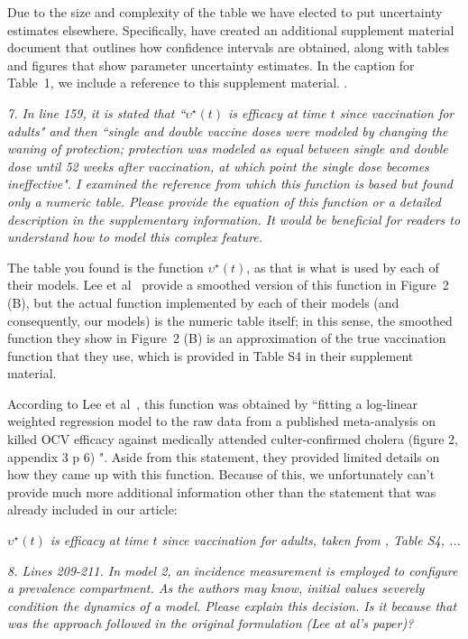 \documentclass[11pt]{article}
\newcommand\report[1]{{\color{mygreen} \vspace{1mm}\hspace{0.25in}\parbox{6in}{\em #1}}}
\newcommand\article[1]{{\color{blue} \vspace{1mm}\hspace{0.25in}\parbox{6in}{\em #1}}}
\begin{document}
Due to the size and complexity of the table we have elected to put uncertainty estimates elsewhere. Specifically, have created an additional supplement material document that outlines how confidence intervals are obtained, along with tables and figures that show parameter uncertainty estimates. In the caption for Table~1, we include a reference to this supplement material. . 

\report{
  7. In line 159, it is stated that ``$\upsilon^\star(t)$ is efficacy at time $t$ since vaccination for adults" and then ``single and double vaccine doses were modeled by changing the waning of protection; protection was modeled as equal between single and double dose until 52 weeks after vaccination, at which point the single dose becomes ineffective". I examined the reference from which this function is based but found only a numeric table. Please provide the equation of this function or a detailed description in the supplementary information. It would be beneficial for readers to understand how to model this complex feature.
}

The table you found is the function $\upsilon^\star(t)$, as that is what is used by each of their models. Lee et al~\cite{lee20} provide a smoothed version of this function in Figure~2 (B), but the actual function implemented by each of their models (and consequently, our models) is the numeric table itself; in this sense, the smoothed function they show in Figure~2 (B) is an approximation of the true vaccination function that they use, which is provided in Table S4 in their supplement material. 

According to Lee et al~\cite{lee20}, this function was obtained by ``fitting a log-linear weighted regression model to the raw data from a published meta-analysis on killed OCV efficacy against medically attended culter-confirmed cholera (figure 2, appendix 3 p 6) \cite{bi17}". Aside from this statement, they provided limited details on how they came up with this function. Because of this, we unfortunately can't provide much more additional information other than the statement that was already included in our article: 

\article{$\upsilon^\star(t)$ is efficacy at time $t$ since vaccination for adults, taken from \cite{lee20}, Table S4, ...}

\report{
  8. Lines 209-211. In model 2, an incidence measurement is employed to configure a prevalence compartment. As the authors may know, initial values severely condition the dynamics of a model. Please explain this decision. Is it because that was the approach followed in the original formulation (Lee at al's paper)?
}
\end{document}
